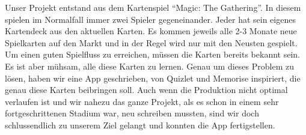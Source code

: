 Unser Projekt entstand aus dem Kartenspiel "`Magic: The Gathering"'. In diesem spielen im Normalfall immer zwei Spieler gegeneinander. Jeder hat sein eigenes Kartendeck aus den aktuellen Karten. Es kommen jeweils alle 2-3 Monate neue Spielkarten auf den Markt und in der Regel wird nur mit den Neusten gespielt. Um einen guten Spielfluss zu erreichen, müssen die Karten bereits bekannt sein. Es ist aber mühsam, alle diese Karten zu lernen. Genau um dieses Problem zu lösen, haben wir eine App geschrieben, von Quizlet und Memorise inspiriert, die genau diese Karten beibringen soll. Auch wenn die Produktion nicht optimal verlaufen ist und wir nahezu das ganze Projekt, als es schon in einem sehr fortgeschrittenen Stadium war, neu schreiben mussten, sind wir doch schlussendlich zu unserem Ziel gelangt und konnten die App fertigstellen.